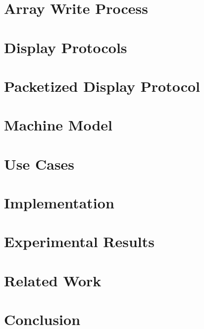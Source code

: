 \documentclass{udthesis}
\begin{document}
    \chapter{Array Write Process} %
        
    \chapter{Display Protocols} %
        
    \chapter{Packetized Display Protocol}
        
    \chapter{Machine Model}
        
    \chapter{Use Cases}
        
    \chapter{Implementation}
        
    \chapter{Experimental Results}
        
    \chapter{Related Work}
        
    \chapter*{Conclusion}
        

\end{document}
